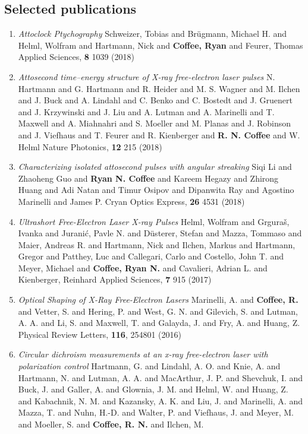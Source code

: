 \subsection*{Selected publications}
\begin{enumerate}
\item \textit{Attoclock Ptychography}
Schweizer, Tobias and Br\"{u}gmann, Michael  H. and Helml, Wolfram and Hartmann, Nick and \textbf{Coffee, Ryan} and Feurer, Thomas
Applied Sciences, \textbf{8} 1039 (2018)
\item \textit{Attosecond time–energy structure of X-ray free-electron laser pulses}
N. Hartmann and G. Hartmann and R. Heider and M. S. Wagner and M. Ilchen and J. Buck and A. Lindahl and C. Benko and C. Bostedt and J. Gruenert and J. Krzywinski and J. Liu and A. Lutman and A. Marinelli and T. Maxwell and A. Miahnahri and S. Moeller and M. Planas and J. Robinson and J. Viefhaus and T. Feurer and R. Kienberger and \textbf{R. N. Coffee} and W. Helml
Nature Photonics, \textbf{12} 215 (2018)
\item \textit{Characterizing isolated attosecond pulses with angular streaking}
Siqi Li and Zhaoheng Guo and \textbf{Ryan N. Coffee} and Kareem Hegazy and Zhirong Huang and Adi Natan and Timur Osipov and Dipanwita Ray and Agostino Marinelli and James P. Cryan
Optics Express, \textbf{26} 4531 (2018)
\item \textit{Ultrashort Free-Electron Laser X-ray Pulses}
Helml, Wolfram and Grguraš, Ivanka and Juranić, Pavle N. and Düsterer, Stefan and Mazza, Tommaso and Maier, Andreas R. and Hartmann, Nick and Ilchen, Markus and Hartmann, Gregor and Patthey, Luc and Callegari, Carlo and Costello, John T. and Meyer, Michael and \textbf{Coffee, Ryan N.} and Cavalieri, Adrian L. and Kienberger, Reinhard
Applied Sciences, \textbf{7} 915 (2017)
\item \textit{Optical Shaping of X-Ray Free-Electron Lasers}
Marinelli, A. and \textbf{Coffee, R.} and Vetter, S. and Hering, P. and West, G. N. and Gilevich, S. and Lutman, A. A. and Li, S. and Maxwell, T. and Galayda, J. and Fry, A. and Huang, Z.
Physical Review Letters, \textbf{116}, 254801 (2016)
\item \textit{Circular dichroism measurements at an x-ray free-electron laser with polarization control}
Hartmann, G.  and Lindahl, A. O.  and Knie, A.  and Hartmann, N.  and Lutman, A. A.  and MacArthur, J. P.  and Shevchuk, I.  and Buck, J.  and Galler, A.  and Glownia, J. M.  and Helml, W.  and Huang, Z.  and Kabachnik, N. M.  and Kazansky, A. K.  and Liu, J.  and Marinelli, A.  and Mazza, T.  and Nuhn, H.-D.  and Walter, P.  and Viefhaus, J.  and Meyer, M.  and Moeller, S.  and \textbf{Coffee, R. N.}  and Ilchen, M.

\end{enumerate}
